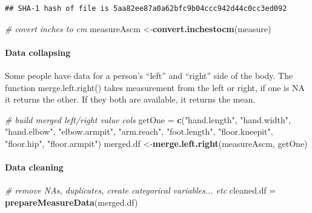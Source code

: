 \documentclass[]{article}
\newenvironment{Shaded}{\begin{snugshade}}{\end{snugshade}}
\newcommand{\CommentTok}[1]{\textcolor[rgb]{0.56,0.35,0.01}{\textit{#1}}}
\newcommand{\KeywordTok}[1]{\textcolor[rgb]{0.13,0.29,0.53}{\textbf{#1}}}
\newcommand{\NormalTok}[1]{#1}
\newcommand{\StringTok}[1]{\textcolor[rgb]{0.31,0.60,0.02}{#1}}
\begin{document}
\begin{verbatim}
## SHA-1 hash of file is 5aa82ee87a0a62bfc9b04ccc942d44c0cc3ed092
\end{verbatim}

\begin{Shaded}
\begin{Highlighting}[]
\CommentTok{\# covert inches to cm}
\NormalTok{measureAscm \textless{}{-}}\KeywordTok{convert.inchestocm}\NormalTok{(measure)}
\end{Highlighting}
\end{Shaded}

\hypertarget{data-collapsing}{%
\paragraph{Data collapsing}\label{data-collapsing}}

Some people have data for a person's ``left'' and ``right'' side of the
body. The function merge.left.right() takes measurement from the left or
right, if one is NA it returns the other. If they both are available, it
returns the mean.

\begin{Shaded}
\begin{Highlighting}[]
\CommentTok{\# build merged left/right value cols}
\NormalTok{getOne =}\StringTok{ }\KeywordTok{c}\NormalTok{(}\StringTok{"hand.length"}\NormalTok{, }\StringTok{"hand.width"}\NormalTok{, }\StringTok{"hand.elbow"}\NormalTok{, }\StringTok{"elbow.armpit"}\NormalTok{, }\StringTok{"arm.reach"}\NormalTok{, }\StringTok{"foot.length"}\NormalTok{, }\StringTok{"floor.kneepit"}\NormalTok{, }\StringTok{"floor.hip"}\NormalTok{, }\StringTok{"floor.armpit"}\NormalTok{)}
\NormalTok{merged.df \textless{}{-}}\KeywordTok{merge.left.right}\NormalTok{(measureAscm, getOne)}
\end{Highlighting}
\end{Shaded}

\hypertarget{data-cleaning}{%
\paragraph{Data cleaning}\label{data-cleaning}}

\begin{Shaded}
\begin{Highlighting}[]
\CommentTok{\# remove NAs, duplicates, create categorical variables... etc }
\NormalTok{cleaned.df =}\StringTok{ }\KeywordTok{prepareMeasureData}\NormalTok{(merged.df)}
\end{Highlighting}
\end{Shaded}
\end{document}

